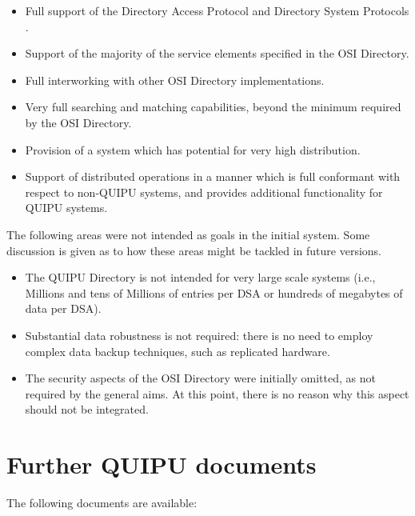 \begin {itemize}
\item Full support of the Directory Access Protocol and Directory System
Protocols \cite{CCITT.Directory}.
\item
Support of the majority of the service elements specified in the OSI Directory.
\item
Full interworking with other OSI Directory implementations.
\item
Very full searching and matching capabilities, beyond the minimum
required by the OSI Directory.
\item
Provision of a system which has potential for very high distribution.

\item Support of distributed operations in a manner which is full
conformant with respect to non-QUIPU systems, and provides additional
functionality for QUIPU systems.

\end {itemize}

The following areas were not intended as goals in the initial system.
Some discussion is given as to how these areas might be tackled in
future versions.

\begin {itemize}
\item
The QUIPU Directory is not intended for very large scale
systems (i.e., Millions and tens of Millions of entries per DSA or hundreds
of megabytes of data per DSA).

\item
Substantial data robustness is not required: there is no need to employ
complex data backup techniques, such as replicated hardware.
\item
The security aspects of the OSI Directory were initially omitted, as not
required by the general aims.   
At this point, there is no reason why this aspect should not be
integrated.

\end {itemize}

\section {Further QUIPU documents}


The following documents are available:

